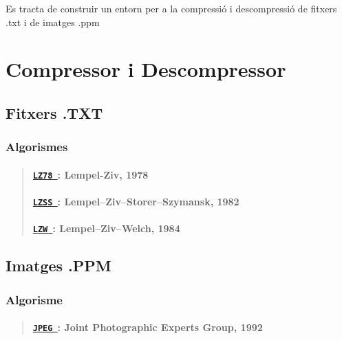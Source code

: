 Es tracta de construir un entorn per a la compressió i descompressió de fitxers .txt i de imatges .ppm

\section*{Compressor i Descompressor}

\subsection*{Fitxers .T\+XT}

\subsubsection*{Algorismes}

\begin{quote}
\paragraph*{\href{./classdomini_1_1algorithm_1_1LZ78.html}{\tt L\+Z78 }\+: Lempel-\/\+Ziv, 1978}

\paragraph*{\href{./classdomini_1_1algorithm_1_1LZSS.html}{\tt L\+Z\+SS }\+: Lempel–\+Ziv–\+Storer–\+Szymansk, 1982}

\paragraph*{\href{./classdomini_1_1algorithm_1_1LZW.html}{\tt L\+ZW }\+: Lempel–\+Ziv–\+Welch, 1984}

\end{quote}
\subsection*{Imatges .P\+PM}

\subsubsection*{Algorisme}

\begin{quote}
\paragraph*{\href{./classdomini_1_1algorithm_1_1JPEG.html}{\tt J\+P\+EG }\+: Joint Photographic Experts Group, 1992}

\end{quote}
